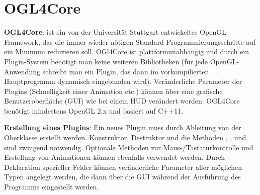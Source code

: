 \section{%
    OGL4Core%
}

\textbf{OGL4Core}:
 ist ein von der Universität Stuttgart entwickeltes OpenGL-Framework,
das die immer wieder nötigen Standard-Programmierungsschritte auf ein Minimum reduzieren soll.
OGl4Core ist plattformunabhängig und durch ein Plugin-System benötigt man keine weiteren
Bibliotheken
(für jede OpenGL-Anwendung schreibt man ein Plugin, das dann im vorkompilierten Hauptprogramm
dynamisch eingebunden wird).
Veränderliche Parameter der Plugins (Schnelligkeit einer Animation etc.)
können über eine grafische Benutzeroberfläche (GUI) wie bei einem HUD verändert werden.
OGL4Core benötigt mindestens OpenGL 2.x und basiert auf C++11.

\textbf{Erstellung eines Plugins}:
Ein neues Plugin muss durch Ableitung von der Oberklasse  erstellt werden.
Konstruktor, Destruktor und die Methoden , ,  und
 sind zwingend notwendig.
Optionale Methoden zur Maus-/Tastaturkontrolle und Erstellung von Animationen können ebenfalls
verwendet werden.
Durch Deklaration spezieller Felder können veränderliche Parameter aller möglichen Typen
angelegt werden, die dann über die GUI während der Ausführung des Programms eingestellt werden.

\pagebreak
